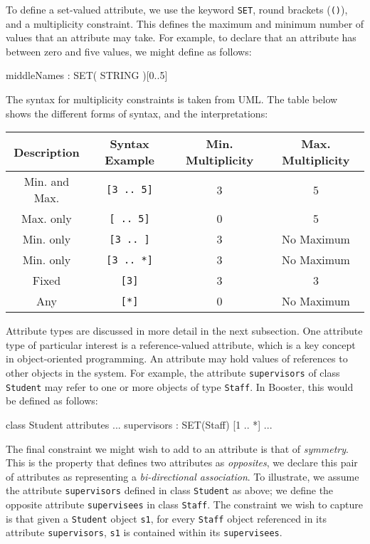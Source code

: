 To define a set-valued attribute, we use the keyword \verb|SET|, round
brackets (\verb|()|), and a multiplicity constraint.  This defines
the maximum and minimum number of values that an attribute may take.
For example, to declare that an attribute has between zero and five
values, we might define as follows:

\begin{code}
  middleNames : SET( STRING )[0..5]
\end{code} 

The syntax for multiplicity constraints is taken from UML.  The table
below shows the different forms of syntax, and the interpretations:

\begin{center}
  \begin{tabular}{ | c | c | c | c |}
    \hline
    \textbf{Description} & \textbf{Syntax Example} & \textbf{Min. Multiplicity} & \textbf{Max. Multiplicity} \\ \hline
    Min. and Max. & \verb|[3 .. 5]| & 3 & 5 \\ \hline
    Max. only & \verb|[ .. 5]| & 0 & 5 \\ \hline
    Min. only & \verb|[3 .. ]| & 3 & No Maximum \\ \hline
    Min. only & \verb|[3 .. *]| & 3 & No Maximum \\ \hline
    Fixed & \verb|[3]| & 3 & 3 \\ \hline
    Any & \verb|[*]| & 0 & No Maximum \\ \hline

  \end{tabular}
\end{center}

Attribute types are discussed in more detail in the next subsection.
One attribute type of particular interest is a reference-valued
attribute, which is a key concept in object-oriented programming.  An
attribute may hold values of references to other objects in the
system.  For example, the attribute \verb|supervisors| of class
\verb|Student| may refer to one or more objects of type \verb|Staff|.
In Booster, this would be defined as follows:

\begin{code}
  class Student
    attributes
      ...
      supervisors : SET(Staff) [1 .. *]
      ...
\end{code}

The final constraint we might wish to add to an attribute is that of
\emph{symmetry}.  This is the property that defines two attributes as
\emph{opposites}, we declare this pair of attributes as representing a
\emph{bi-directional association}.  To illustrate, we assume the
attribute \verb|supervisors| defined in class \verb|Student| as above;
we define the opposite attribute \verb|supervisees| in class
\verb|Staff|.  The constraint we wish to capture is that given a
\verb|Student| object \verb|s1|, for every \verb|Staff| object
referenced in its attribute \verb|supervisors|, \verb|s1| is contained
within its \verb|supervisees|.


